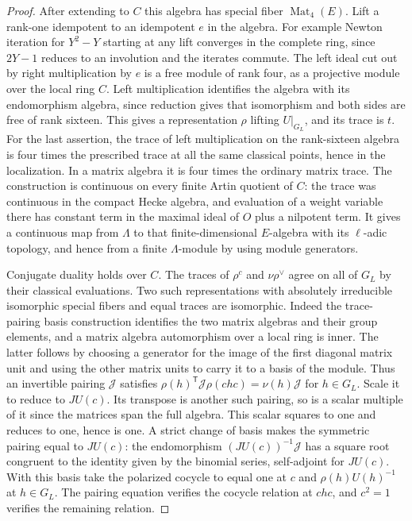 \documentclass[a4paper,11pt]{article}
\theoremstyle{definition}
\theoremstyle{remark}
\numberwithin{equation}{section}
\begin{document}
\begin{proof}
After extending to \(C\) this algebra has special fiber
\(\operatorname{Mat}_4(E)\). Lift a rank-one idempotent to
an idempotent \(e\) in the algebra. For example Newton
iteration for \(Y^2-Y\) starting at any lift converges in
the complete ring, since \(2Y-1\) reduces to an involution
and the iterates commute. The left ideal cut out by right
multiplication by \(e\) is a free module of rank four,
as a projective module over the local ring \(C\). Left
multiplication identifies the algebra with its endomorphism
algebra, since reduction gives that isomorphism and both
sides are free of rank sixteen. This gives a representation
\(\rho\) lifting \(U|_{G_L}\), and its trace is \(t\).
For the last assertion, the trace of left multiplication
on the rank-sixteen algebra is four times the prescribed
trace at all the same classical points, hence in the
localization. In a matrix algebra it is four times the
ordinary matrix trace. The construction is continuous on
every finite Artin quotient of \(C\): the trace was continuous
in the compact Hecke algebra, and evaluation of a weight
variable there has constant term in the maximal ideal of
\(O\) plus a nilpotent term. It gives a continuous map from
\(\Lambda\) to that finite-dimensional \(E\)-algebra with
its \(\ell\)-adic topology, and hence from a finite
\(\Lambda\)-module by using module generators.

Conjugate duality holds over \(C\). The traces of
\(\rho^c\) and \(\nu\rho^\vee\) agree on all of \(G_L\)
by their classical evaluations. Two such representations
with absolutely irreducible isomorphic special fibers and
equal traces are isomorphic. Indeed the trace-pairing
basis construction identifies the two matrix algebras and
their group elements, and a matrix algebra automorphism
over a local ring is inner. The latter follows by choosing
a generator for the image of the first diagonal matrix
unit and using the other matrix units to carry it to a
basis of the module. Thus an invertible pairing
\(\mathcal J\) satisfies
\(\rho(h)^{\mathsf T}\mathcal J\rho(chc)=\nu(h)\mathcal J\)
for \(h\in G_L\). Scale it to reduce to \(J U(c)\).
Its transpose is another such pairing, so is a scalar
multiple of it since the matrices span the full algebra.
This scalar squares to one and reduces to one, hence is one.
A strict change of basis makes the symmetric pairing equal
to \(JU(c)\): the endomorphism \((JU(c))^{-1}\mathcal J\)
has a square root congruent to the identity given by the
binomial series, self-adjoint for \(JU(c)\).
With this basis take the polarized cocycle to equal one
at \(c\) and \(\rho(h)U(h)^{-1}\) at \(h\in G_L\).
The pairing equation verifies the cocycle relation at
\(chc\), and \(c^2=1\) verifies the remaining relation.


\end{proof}
\end{document}
